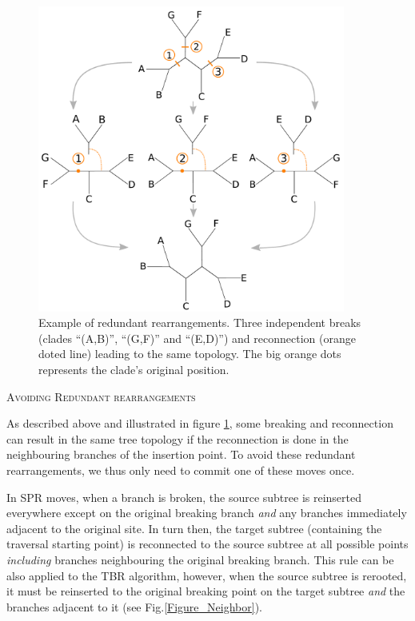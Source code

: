 \documentclass[12pt,letterpaper]{article}
\renewcommand{\section}[1]{%
\bigskip
\begin{center}
\begin{Large}
\normalfont\scshape #1
\medskip
\end{Large}
\end{center}}
\begin{document}
\begin{figure}[!htbp]
\centering
   \includegraphics[width=0.9\textwidth]{Figure/Figure_Redundantswaps.pdf}
\caption{Example of redundant rearrangements. Three independent breaks (clades ``(A,B)'', ``(G,F)'' and ``(E,D)'') and reconnection (orange doted line) leading to the same topology. The big orange dots represents the clade's original position.}
\label{Figure_redundant}
\end{figure}

\section{Avoiding Redundant rearrangements}
As described above and illustrated in figure \ref{Figure_redundant}, some breaking and reconnection can result in the same tree topology if the reconnection is done in the neighbouring branches of the insertion point.
To avoid these redundant rearrangements, we thus only need to commit one of these moves once.

In SPR moves, when a branch is broken, the source subtree is reinserted everywhere except on the original breaking branch \textit{and} any branches immediately adjacent to the original site. 
In turn then, the target subtree (containing the traversal starting point) is reconnected to the source subtree at all possible points \textit{including} branches neighbouring the original breaking branch.
This rule can be also applied to the TBR algorithm, however, when the source subtree is rerooted, it must be reinserted to the original breaking point on the target subtree \textit{and} the branches adjacent to it (see Fig.\ref{Figure_Neighbor}).
\end{document}
